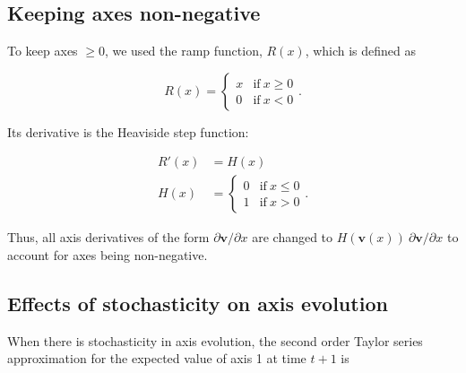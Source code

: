 \subsection*{Keeping axes non-negative}

To keep axes $\ge 0$, we used the ramp function, $R(x)$, which is defined as

\begin{equation*}
    R(x) = \begin{cases}
        x & \text{if}\ x \ge 0 \\
        0 & \text{if}\ x < 0
        \end{cases}
    \text{.}
\end{equation*}


\noindent Its derivative is the Heaviside step function:

\begin{equation*}
\begin{split}
    R'(x) &= H(x) \\
    H(x) &= \begin{cases}
        0 & \text{if}\ x \le 0 \\
        1 & \text{if}\ x > 0
        \end{cases}
    \text{.}
\end{split}
\end{equation*}


Thus, all axis derivatives of the form $\partial \mathbf{v} / \partial x$
are changed to $H(\mathbf{v}(x)) \: \partial \mathbf{v} / \partial x$ to 
account for axes being non-negative.






\subsection*{Effects of stochasticity on axis evolution}

When there is stochasticity in axis evolution,
the second order Taylor series approximation for the expected
value of axis 1 at time $t+1$ is

